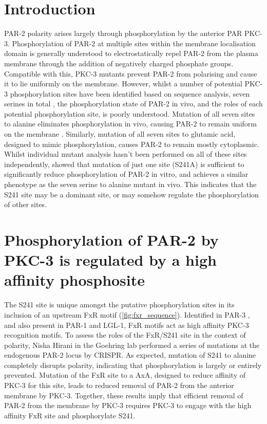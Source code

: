 \documentclass[12pt]{"report"}
\begin{document}
\clearpage
\section*{Introduction}

PAR-2 polarity arises largely through phosphorylation by the anterior PAR PKC-3. Phosphorylation of PAR-2 at multiple sites within the membrane localisation domain is generally understood to electrostatically repel PAR-2 from the plasma membrane through the addition of negatively charged phosphate groups. Compatible with this, PKC-3 mutants prevent PAR-2 from polarising and cause it to lie uniformly on the membrane. However, whilst a number of potential PKC-3 phosphorylation sites have been identified based on sequence analysis, seven serines in total \citep{Hao2006}, the phosphorylation state of PAR-2 in vivo, and the roles of each potential phosphorylation site, is poorly understood. Mutation of all seven sites to alanine eliminates phosphorylation in vivo, causing PAR-2 to remain uniform on the membrane \citep{Hao2006}. Similarly, mutation of all seven sites to glutamic acid, designed to mimic phosphorylation, causes PAR-2 to remain mostly cytoplasmic. Whilst individual mutant analysis hasn't been performed on all of these sites independently, \textcite{Motegi2011} showed that mutation of just one site (S241A) is sufficient to significantly reduce phosphorylation of PAR-2 in vitro, and achieves a similar phenotype as the seven serine to alanine mutant in vivo. This indicates that the S241 site may be a dominant site, or may somehow regulate the phosphorylation of other sites.\\

\section*{Phosphorylation of PAR-2 by PKC-3 is regulated by a high affinity phosphosite}

The S241 site is unique amongst the putative phosphorylation sites in its inclusion of an upstream FxR motif (\cref{fig:fxr_sequence}). Identified in PAR-3 \citep{Soriano2016}, and also present in PAR-1 and LGL-1, FxR motifs act as high affinity PKC-3 recognition motifs. To assess the roles of the FxR/S241 site in the context of polarity, Nisha Hirani in the Goehring lab performed a series of mutations at the endogenous PAR-2 locus by CRISPR. As expected, mutation of S241 to alanine completely disrupts polarity, indicating that phosphorylation is largely or entirely prevented. Mutation of the FxR site to a AxA, designed to reduce affinity of PKC-3 for this site, leads to reduced removal of PAR-2 from the anterior membrane by PKC-3. Together, these results imply that efficient removal of PAR-2 from the membrane by PKC-3 requires PKC-3 to engage with the high affinity FxR site and phosphorylate S241.\\
\end{document}
